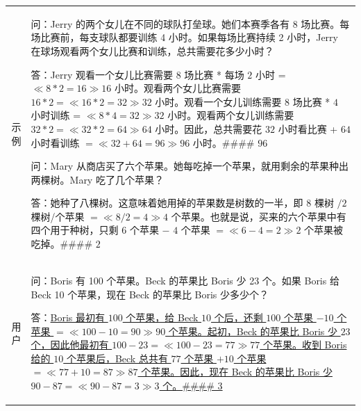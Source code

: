 \vspace{0.5em}
\begin{tcolorbox}

\begingroup
\setlength{\leftskip}{0em}
\setlength{\rightskip}{2em}

\begin{tabular}{r l l}
{\color{gray} \footnotesize{示例}} &
\multicolumn{2}{p{0.8\textwidth}}{
问：Jerry 的两个女儿在不同的球队打垒球。她们本赛季各有 8 场比赛。每场比赛前，每支球队都要训练 4 小时。如果每场比赛持续 2 小时，Jerry 在球场观看两个女儿比赛和训练，总共需要花多少小时？

\vspace{0.3em}

答：Jerry 观看一个女儿比赛需要 $8$ 场比赛 * 每场 $2$ 小时 = $\ll 8*2=16 \gg 16$ 小时。观看两个女儿比赛需要 $16 * 2 = \ll 16*2=32 \gg 32$ 小时。观看一个女儿训练需要 $8$ 场比赛 * $4$ 小时训练 = $\ll 8*4=32 \gg 32$ 小时。观看两个女儿训练需要 $32 * 2 = \ll 32*2=64 \gg 64$ 小时。因此，总共需要花 $32$ 小时看比赛 + $64$ 小时看训练 $= \ll 32+64=96 \gg 96$ 小时。\#\#\#\# $96$

\vspace{0.7em}

问：Mary 从商店买了六个苹果。她每吃掉一个苹果，就用剩余的苹果种出两棵树。Mary 吃了几个苹果？

\vspace{0.3em}

答：她种了八棵树。这意味着她用掉的苹果数是树数的一半，即 $8$ 棵树 $/ 2$ 棵树/个苹果 $= \ll 8/2=4 \gg 4$ 个苹果。也就是说，买来的六个苹果中有四个用于种树，只剩 $6$ 个苹果 $-$ $4$ 个苹果 $= \ll 6-4=2 \gg 2$ 个苹果被吃掉。\#\#\#\# $2$

\vspace{0.7em}
} \\
{\color{gray} \footnotesize{用户}} &
\multicolumn{2}{p{0.8\textwidth}}{
问：Boris 有 100 个苹果。Beck 的苹果比 Boris 少 23 个。如果 Boris 给 Beck 10 个苹果，现在 Beck 的苹果比 Boris 少多少个？
\vspace{0.3em}

答：\uline{Boris 最初有 $100$ 个苹果，给 Beck $10$ 个后，还剩 $100$ 个苹果 $- 10$ 个苹果 $= \ll 100-10=90 \gg 90$ 个苹果。起初，Beck 的苹果比 Boris 少 $23$ 个，因此他最初有 $100 - 23 = \ll 100-23=77 \gg 77$ 个苹果。收到 Boris 给的 $10$ 个苹果后，Beck 总共有 $77$ 个苹果 $+ 10$ 个苹果 $= \ll 77+10=87 \gg 87$ 个苹果。因此，现在 Beck 的苹果比 Boris 少 $90 - 87 = \ll 90-87=3 \gg 3$ 个。\#\#\#\# 3}
}
\end{tabular}

\endgroup

\end{tcolorbox}
\vspace{0.5em}

